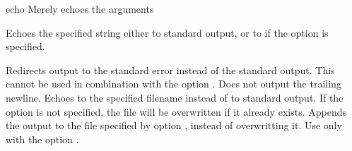 \begin{nusmvCommand}{echo} {Merely echoes the arguments}


Echoes the specified string either to standard output, or to
 if the option  is specified.
\begin{cmdOpt}
 {Redirects output to the standard error instead of the
  standard output. This cannot be used in combination with the
  option .}
 {Does not output the trailing newline.}
 { Echoes to the specified
  filename instead of to standard output. If the option
   is not specified, the file 
  will be overwritten if it already exists. }
 {Appends the output to the file specified by option
  , instead of overwritting it. Use only with the
  option .}
\end{cmdOpt}
\end{nusmvCommand}
